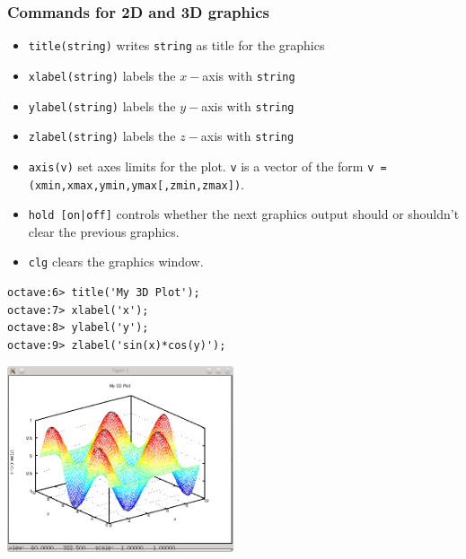 \documentclass[t,compress,xcolor=svgnames]{beamer}
\begin{document}
\begin{frame}
  \frametitle{\small Commands for 2D and 3D graphics}
  \begin{itemize}
    \item \texttt{title(string)} writes \texttt{string} as title for the graphics
    \item \texttt{xlabel(string)} labels the $x-$axis with \texttt{string}
    \item \texttt{ylabel(string)} labels the $y-$axis with \texttt{string}
    \item \texttt{zlabel(string)} labels the $z-$axis with \texttt{string}
    \item \texttt{axis(v)} set axes limits for the plot. \texttt{v} is a vector of the form \texttt{v = (xmin,xmax,ymin,ymax[,zmin,zmax])}.
    \item \texttt{hold [on|off]} controls whether the next graphics output should or shouldn't clear the previous graphics.
    \item \texttt{clg} clears the graphics window.
  \end{itemize}
  \framebreak
  \begin{verbatim}
octave:6> title('My 3D Plot');
octave:7> xlabel('x');
octave:8> ylabel('y');
octave:9> zlabel('sin(x)*cos(y)');
  \end{verbatim}
  \begin{center}
    \includegraphics[width=0.5\textwidth]{./octave-plot-3d-title}
  \end{center}
\end{frame}
\end{document}
